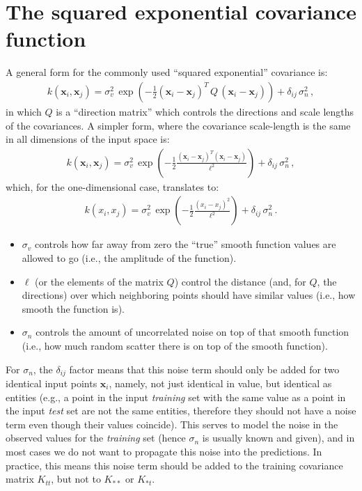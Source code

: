 \documentclass[11pt,a4paper]{article}
\numberwithin{equation}{section}
\begin{document}
\section{The squared exponential covariance function}

A general form for the commonly used ``squared exponential'' covariance is:
\begin{align}
k(\mathbf{x}_i,\mathbf{x}_j) = \sigma_v^2\,\exp\left(-\frac{1}{2}(\mathbf{x}_i - \mathbf{x}_j)^T\,Q\,(\mathbf{x}_i - \mathbf{x}_j)\right) + \delta_{ij}\,\sigma_n^2\,,
\end{align}
in which $Q$ is a ``direction matrix'' which controls the directions and scale lengths of the covariances. A simpler form, where the covariance scale-length is the same in all dimensions of the input space is:
\begin{align}
k(\mathbf{x}_i,\mathbf{x}_j) = \sigma_v^2\,\exp\left(-\frac{1}{2}\frac{(\mathbf{x}_i - \mathbf{x}_j)^T(\mathbf{x}_i - \mathbf{x}_j)}{\ell^2}\right) + \delta_{ij}\,\sigma_n^2\,,
\end{align}
which, for the one-dimensional case, translates to:
\begin{align}
k(x_i,x_j) = \sigma_v^2\,\exp\left(-\frac{1}{2}\frac{(x_i - x_j)^2}{\ell^2}\right) + \delta_{ij}\,\sigma_n^2\,.
\end{align}

\begin{itemize}
  \item $\sigma_v$ controls how far away from zero the ``true'' smooth function values are allowed to go (i.e., the amplitude of the function).
  \item $\ell$ (or the elements of the matrix $Q$) control the distance (and, for $Q$, the directions) over which neighboring points should have similar values (i.e., how smooth the function is).
  \item $\sigma_n$ controls the amount of uncorrelated noise on top of that smooth function (i.e., how much random scatter there is on top of the smooth function).
\end{itemize}

For $\sigma_n$, the $\delta_{ij}$ factor means that this noise term should only be added for two identical input points $\mathbf{x}_i$, namely, not just identical in value, but identical as entities (e.g., a point in the input \emph{training} set with the same value as a point in the input \emph{test} set are not the same entities, therefore they should not have a noise term even though their values coincide). This serves to model the noise in the observed values for the \emph{training} set (hence $\sigma_n$ is usually known and given), and in most cases we do not want to propagate this noise into the predictions. In practice, this means this noise term should be added to the training covariance matrix $K_{tt}$, but not to $K_{**}$ or $K_{*t}$.
\end{document}
